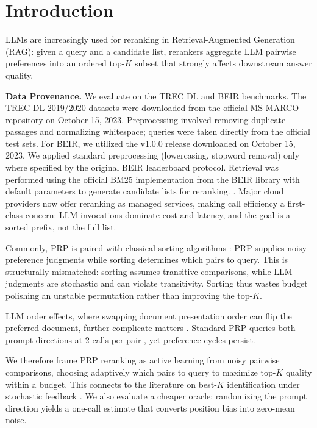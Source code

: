 \documentclass[11pt]{article}
\begin{document}
\section{Introduction}
LLMs are increasingly used for reranking in Retrieval-Augmented Generation (RAG): given a query and a candidate list, rerankers aggregate LLM pairwise preferences into an ordered top-$K$ subset that strongly affects downstream answer quality. 

\textbf{Data Provenance.} We evaluate on the TREC DL and BEIR benchmarks. The TREC DL 2019/2020 datasets were downloaded from the official MS MARCO repository on October 15, 2023. Preprocessing involved removing duplicate passages and normalizing whitespace; queries were taken directly from the official test sets. For BEIR, we utilized the v1.0.0 release downloaded on October 15, 2023. We applied standard preprocessing (lowercasing, stopword removal) only where specified by the original BEIR leaderboard protocol. Retrieval was performed using the official BM25 implementation from the BEIR library with default parameters to generate candidate lists for reranking.
\citep{zhou2025large, zhu2023llmir,dong2024grag,sun2025dynamicrag}.
Major cloud providers now offer reranking as managed services, making call efficiency a first-class concern: LLM invocations dominate cost and latency, and the goal is a sorted prefix, not the full list.

Commonly, PRP is paired with classical sorting algorithms
\citep{qin2024pairwise,sun2023chatgptsearch}: PRP supplies noisy preference judgments while sorting determines which pairs to query.
This is structurally mismatched: sorting assumes transitive comparisons, while LLM judgments are stochastic and can violate transitivity.
Sorting thus wastes budget polishing an unstable permutation rather than improving the top-$K$.

LLM order effects, where swapping document presentation order can flip the preferred document, further complicate matters \citep{shi2024judges,yin2025fragile,jeong2025comparativetrap}.
Standard PRP queries both prompt directions at 2 calls per pair \citep{qin2024pairwise,wu2025realtimeprp}, yet preference cycles persist.

We therefore frame PRP reranking as active learning from noisy pairwise comparisons, choosing adaptively which pairs to query to maximize top-$K$ quality within a budget. This connects to the literature on best-$K$ identification under stochastic feedback
\citep{mohajer2017active,heckel2016activeranking,shah2018simplerobust,ren2020bestk,luo-etal-2024-prp}.
We also evaluate a cheaper oracle: randomizing the prompt direction yields a one-call estimate that converts position bias into zero-mean noise.
\end{document}
